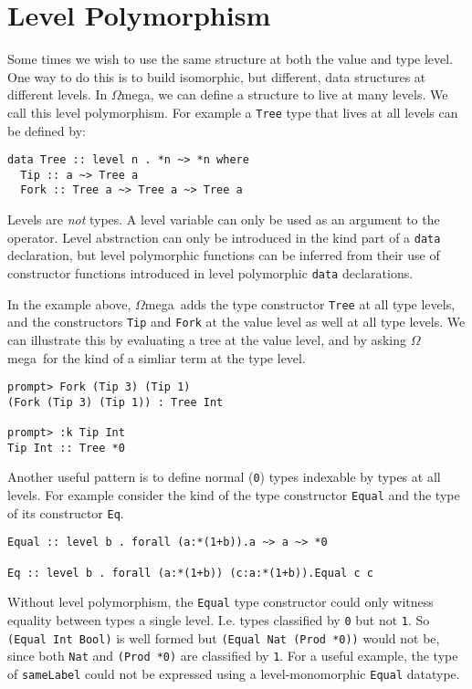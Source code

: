 \documentclass[11pt,twoside]{article}
\newcommand{\om}{$\Omega$mega}
\begin{document}
\section{Level Polymorphism}
Some times we wish to use the same structure at both the value and type level.
One way to do this is to build isomorphic, but different, data structures
at different levels. In \om, we can define a structure to live
at many levels. We call this level polymorphism. For example
a {\tt Tree} type that lives at all levels can be defined by:

\begin{verbatim}
data Tree :: level n . *n ~> *n where
  Tip :: a ~> Tree a
  Fork :: Tree a ~> Tree a ~> Tree a
\end{verbatim}
\noindent
Levels are {\it not} types. A level variable can only be used
as an argument to the {\tt *} operator. Level abstraction can only
be introduced in the kind part of a {\tt data} declaration, but level polymorphic
functions can be inferred from their use of constructor functions
introduced in level polymorphic {\tt data} declarations.

In the example above,
\om\ adds the type constructor {\tt Tree} at all type levels,
and the constructors {\tt Tip} and {\tt Fork} at the value level
as well at all type levels. We can illustrate this by evaluating
a tree at the value level, and by asking \om\ for the kind of
a simliar term at the type level.

\begin{verbatim}
prompt> Fork (Tip 3) (Tip 1)
(Fork (Tip 3) (Tip 1)) : Tree Int

prompt> :k Tip Int
Tip Int :: Tree *0 
\end{verbatim}

Another useful pattern is to define normal ({\tt *0}) types indexable
by types at all levels. For example consider the kind of the type constructor
{\tt Equal} and the type of its constructor {\tt Eq}.

\begin{verbatim}
Equal :: level b . forall (a:*(1+b)).a ~> a ~> *0

Eq :: level b . forall (a:*(1+b)) (c:a:*(1+b)).Equal c c
\end{verbatim}
Without level polymorphism, the {\tt Equal} type constructor could only
witness equality between types a single level. I.e. types classified by
{\tt *0} but not {\tt *1}. So {\tt (Equal Int Bool)} is well formed
but {\tt (Equal Nat (Prod *0))} would not be, since both {\tt Nat}
and {\tt (Prod *0)} are classified by {\tt *1}. For a useful
example, the type of {\tt sameLabel} could not be expressed
using a level-monomorphic {\tt Equal} datatype.
\end{document}
